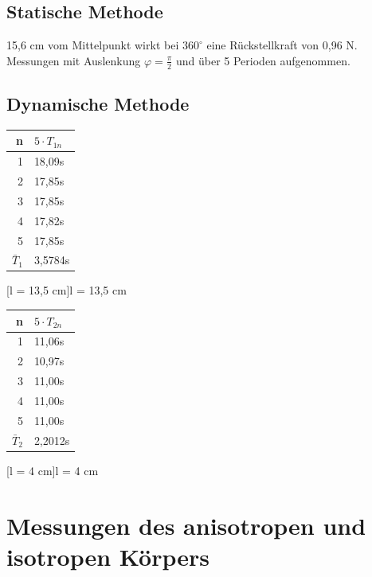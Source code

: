 \documentclass[12pt,a4paper,]{scrreprt}
\let\phi\varphi
\begin{document}
 	\subsection{Statische Methode}
		15,6 cm vom Mittelpunkt wirkt bei $360^\circ$ eine Rückstellkraft von 0,96 N.\\
    	Messungen mit Auslenkung $\phi = \frac{\pi}{2}$ und über 5 Perioden aufgenommen. 
        \subsection{Dynamische Methode}
        \begin{multicols}{2}
			\begin{center}
				\begin{tabular}{r|l}
                	n &  $5 \cdot T_{1n}$ \\ \hline \hline
					1 & 18,09s \\ 
					2 & 17,85s \\ 
					3 & 17,85s \\ 
					4 & 17,82s \\ 
					5 & 17,85s \\ \hline 
					$\bar T_1 $ & 3,5784s
           		\end{tabular}
                [l = 13,5 cm]{l = 13,5 cm}
			\end{center}
		    	
			\begin{center}
				\begin{tabular}{r|l}
					n &  $5 \cdot T_{2n}$ \\ \hline \hline						
                    1 & 11,06s \\ 
					2 & 10,97s \\ 
					3 & 11,00s \\ 
					4 & 11,00s \\ 
					5 & 11,00s \\ \hline
                    $\bar T_2 $ & 2,2012s
				\end{tabular}
                [l = 4 cm]{l = 4 cm}
			\end{center}
       	\end{multicols}
		
        \section{Messungen des anisotropen und isotropen Körpers}
        
\end{document}
